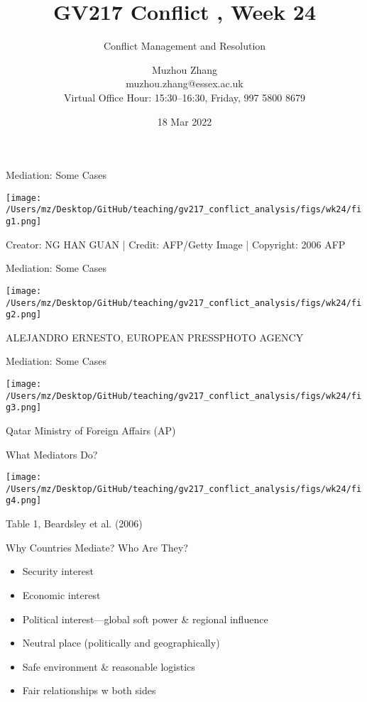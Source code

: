 \documentclass[handout]{beamer}
\title{GV217 Conflict , Week 24}
\subtitle{Conflict Management and Resolution}
\author{Muzhou Zhang\\ muzhou.zhang@essex.ac.uk\\ Virtual Office Hour: 15:30--16:30, Friday, 997 5800 8679}
\date{18 Mar 2022}
\begin{document}
\maketitle
{}

\begin{frame}{Mediation: Some Cases}
    \pause
    \begin{center}
        \texttt{[image: /Users/mz/Desktop/GitHub/teaching/gv217\_conflict\_analysis/figs/wk24/fig1.png]}
    \end{center}
    \tiny Creator: NG HAN GUAN | Credit: AFP/Getty Image | Copyright: 2006 AFP
\end{frame}

\begin{frame}{Mediation: Some Cases}
    \pause
    \begin{center}
        \texttt{[image: /Users/mz/Desktop/GitHub/teaching/gv217\_conflict\_analysis/figs/wk24/fig2.png]}
    \end{center}
    \tiny ALEJANDRO ERNESTO, EUROPEAN PRESSPHOTO AGENCY
\end{frame}

\begin{frame}{Mediation: Some Cases}
    \pause
    \begin{center}
        \texttt{[image: /Users/mz/Desktop/GitHub/teaching/gv217\_conflict\_analysis/figs/wk24/fig3.png]}
    \end{center}
    \tiny Qatar Ministry of Foreign Affairs (AP)
\end{frame}

\begin{frame}{What Mediators Do?}
    \pause
    \begin{center}
        \texttt{[image: /Users/mz/Desktop/GitHub/teaching/gv217\_conflict\_analysis/figs/wk24/fig4.png]}
    \end{center}
    \tiny Table 1, Beardsley et al. (2006)
\end{frame}

\begin{frame}{Why Countries Mediate? Who Are They?}
    \begin{itemize}
        \pause\item Security interest
        \pause\item Economic interest
        \pause\item Political interest---global soft power \& regional influence
        \pause\item Neutral place (politically and geographically)
        \pause\item Safe environment \& reasonable logistics
        \pause\item Fair relationships w both sides
    \end{itemize}
\end{frame}
\end{document}
